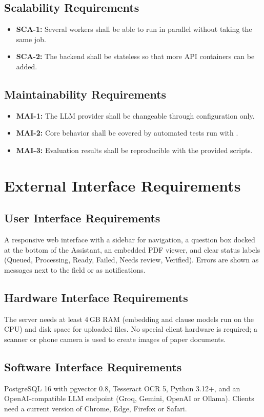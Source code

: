 \subsection{Scalability Requirements}
\begin{itemize}
\item \textbf{SCA-1:} Several workers shall be able to run in parallel without taking the same job.
\item \textbf{SCA-2:} The backend shall be stateless so that more API containers can be added.
\end{itemize}
\subsection{Maintainability Requirements}
\begin{itemize}
\item \textbf{MAI-1:} The LLM provider shall be changeable through configuration only.
\item \textbf{MAI-2:} Core behavior shall be covered by automated tests run with .
\item \textbf{MAI-3:} Evaluation results shall be reproducible with the provided scripts.
\end{itemize}

\section{External Interface Requirements}
\subsection{User Interface Requirements}
A responsive web interface with a sidebar for navigation, a question box docked at the bottom of the
Assistant, an embedded PDF viewer, and clear status labels (Queued, Processing, Ready, Failed, Needs
review, Verified). Errors are shown as messages next to the field or as notifications.
\subsection{Hardware Interface Requirements}
The server needs at least 4\,GB RAM (embedding and clause models run on the CPU) and disk space for
uploaded files. No special client hardware is required; a scanner or phone camera is used to create
images of paper documents.
\subsection{Software Interface Requirements}
PostgreSQL 16 with pgvector 0.8, Tesseract OCR 5, Python 3.12+, and an OpenAI-compatible LLM endpoint
(Groq, Gemini, OpenAI or Ollama). Clients need a current version of Chrome, Edge, Firefox or Safari.
